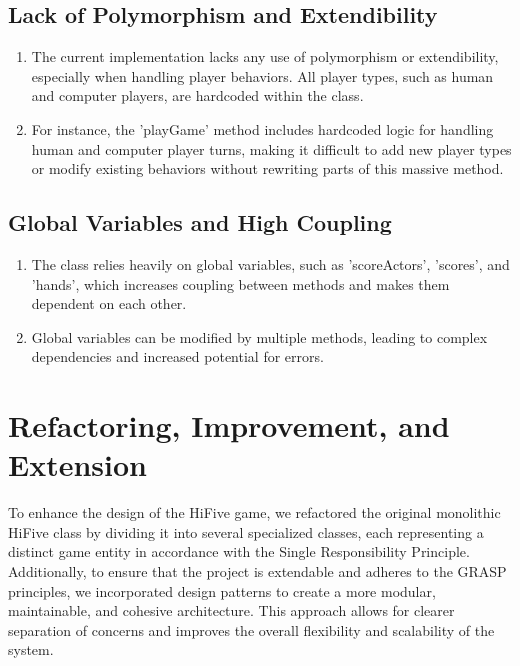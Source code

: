 \documentclass[a4paper, 12pt]{report}
\begin{document}
    \section{Lack of Polymorphism and Extendibility}
    \begin{enumerate}
        \item The current implementation lacks any use of polymorphism or extendibility, especially when handling player behaviors. All player types, such as human and computer players, are hardcoded within the class.
        \item For instance, the 'playGame' method includes hardcoded logic for handling human and computer player turns, making it difficult to add new player types or modify existing behaviors without rewriting parts of this massive method.
    \end{enumerate}

    \section{Global Variables and High Coupling}
    \begin{enumerate}
        \item The class relies heavily on global variables, such as 'scoreActors', 'scores', and 'hands', which increases coupling between methods and makes them dependent on each other.
        \item Global variables can be modified by multiple methods, leading to complex dependencies and increased potential for errors.
    \end{enumerate}
    
    \newpage

    \chapter{Refactoring, Improvement, and Extension}

    To enhance the design of the HiFive game, we refactored the original monolithic HiFive class by dividing it into several specialized classes, each representing a distinct game entity in accordance with the Single Responsibility Principle. Additionally, to ensure that the project is extendable and adheres to the GRASP principles, we incorporated design patterns to create a more modular, maintainable, and cohesive architecture. This approach allows for clearer separation of concerns and improves the overall flexibility and scalability of the system.
\end{document}
